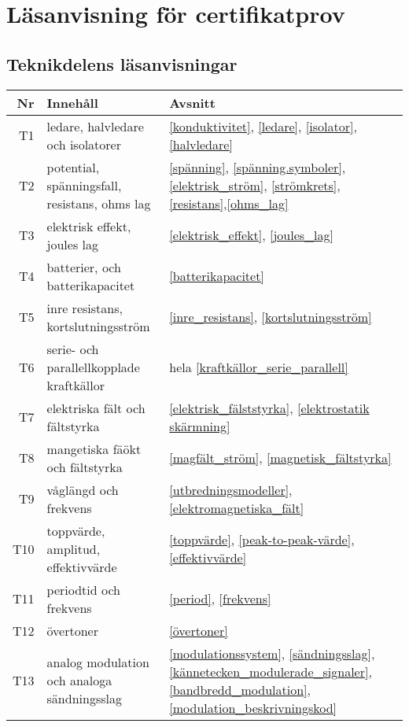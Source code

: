 

\onecolumn

\chapter{Läsanvisning för certifikatprov}

\section{Teknikdelens läsanvisningar}


\begin{table}[H]
	\small
\begin{tabular}{rll}
\textbf{Nr} & \textbf{Innehåll} & \textbf{Avsnitt}\\ \hline\hline
T1 & ledare, halvledare och isolatorer & 
\ref{konduktivitet}, \ref{ledare}, \ref{isolator}, \ref{halvledare}\\ \hline
T2 & potential, spänningsfall, resistans, ohms lag &
\ref{spänning}, \ref{spänning.symboler}, \ref{elektrisk_ström}, \ref{strömkrets}, \ref{resistans},\ref{ohms_lag}\\ \hline
T3 & elektrisk effekt, joules lag &
\ref{elektrisk_effekt}, \ref{joules_lag}\\ \hline
T4 & batterier, och batterikapacitet & 
\ref{batterikapacitet}\\ \hline
T5 & inre resistans, kortslutningsström & 
\ref{inre_resistans}, \ref{kortslutningsström}\\ \hline
T6 & serie- och parallellkopplade kraftkällor &
hela \ref{kraftkällor_serie_parallell}\\ \hline
T7 & elektriska fält och fältstyrka &
\ref{elektrisk_fälststyrka}, \ref{elektrostatik skärmning}\\ \hline
T8 & mangetiska fäökt och fältstyrka &
\ref{magfält_ström}, \ref{magnetisk_fältstyrka}\\ \hline
T9 & våglängd och frekvens &
\ref{utbredningsmodeller}, \ref{elektromagnetiska_fält}\\ \hline
T10 & toppvärde, amplitud, effektivvärde &
\ref{toppvärde}, \ref{peak-to-peak-värde}, \ref{effektivvärde}\\ \hline
T11 & periodtid och frekvens&
\ref{period}, \ref{frekvens}\\ \hline
T12 & övertoner &
\ref{övertoner}\\ \hline
T13 & analog modulation och analoga sändningsslag&
\ref{modulationssystem}, \ref{sändningsslag}, \ref{kännetecken_modulerade_signaler}, 
\ref{bandbredd_modulation},  \ref{modulation_beskrivningskod}\\

\end{tabular}
\end{table}
